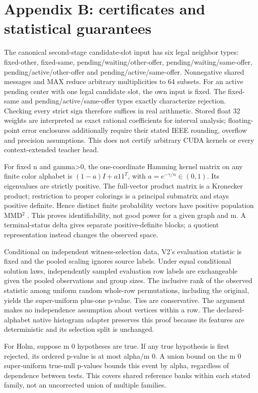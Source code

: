 \documentclass[
  11pt,
]{article}
\begin{document}
\section{Appendix B: certificates and statistical
guarantees}\label{appendix-b-certificates-and-statistical-guarantees}

The canonical second-stage candidate-slot input has six legal neighbor
types: fixed-other, fixed-same, pending/waiting/other-offer,
pending/waiting/same-offer, pending/active/other-offer and
pending/active/same-offer. Nonnegative shared messages and MAX reduce
arbitrary multiplicities to 64 subsets. For an active pending center
with one legal candidate slot, the own input is fixed. The fixed-same
and pending/active/same-offer types exactly characterize rejection.
Checking every strict sign therefore suffices in real arithmetic. Stored
float 32 weights are interpreted as exact rational coefficients for
interval analysis; floating-point error enclosures additionally require
their stated IEEE rounding, overflow and precision assumptions. This
does not certify arbitrary CUDA kernels or every context-extended
teacher head.

For fixed n and gamma\textgreater0, the one-coordinate Hamming kernel
matrix on any finite color alphabet is \((1-a)I+a11^T\), with
\(a=e^{-\gamma/n}\in(0,1)\). Its eigenvalues are strictly positive. The
full-vector product matrix is a Kronecker product; restriction to proper
colorings is a principal submatrix and stays positive definite. Hence
distinct finite probability vectors have positive population MMD\(^2\) .
This proves identifiability, not good power for a given graph and m. A
terminal-status delta gives separate positive-definite blocks; a
quotient representation instead changes the observed space.

Conditional on independent witness-selection data, V2's evaluation
statistic is fixed and the pooled scaling ignores source labels. Under
equal conditional solution laws, independently sampled evaluation row
labels are exchangeable given the pooled observations and group sizes.
The inclusive rank of the observed statistic among uniform random
whole-row permutations, including the original, yields the super-uniform
plus-one p-value. Ties are conservative. The argument makes no
independence assumption about vertices within a row. The
declared-alphabet native histogram adapter preserves this proof because
its features are deterministic and its selection split is unchanged.

For Holm, suppose m 0 hypotheses are true. If any true hypothesis is
first rejected, its ordered p-value is at most alpha/m 0. A union bound
on the m 0 super-uniform true-null p-values bounds this event by alpha,
regardless of dependence between tests. This covers shared reference
banks within each stated family, not an uncorrected union of multiple
families.
\end{document}

